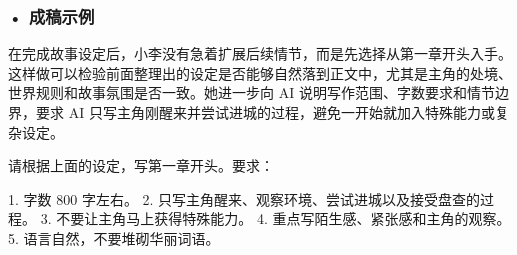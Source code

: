 \subsubsection*{\textbf{• 成稿示例}}

在完成故事设定后，小李没有急着扩展后续情节，而是先选择从第一章开头入手。这样做可以检验前面整理出的设定是否能够自然落到正文中，尤其是主角的处境、世界规则和故事氛围是否一致。她进一步向 AI 说明写作范围、字数要求和情节边界，要求 AI 只写主角刚醒来并尝试进城的过程，避免一开始就加入特殊能力或复杂设定。

\begin{userbox}
请根据上面的设定，写第一章开头。要求：

1. 字数 800 字左右。
2. 只写主角醒来、观察环境、尝试进城以及接受盘查的过程。
3. 不要让主角马上获得特殊能力。
4. 重点写陌生感、紧张感和主角的观察。
5. 语言自然，不要堆砌华丽词语。
\end{userbox}

